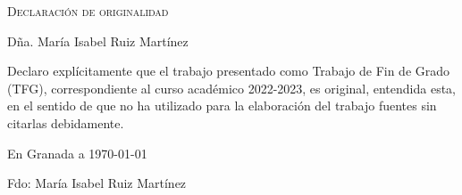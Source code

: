 \newpage
\null
\thispagestyle{empty}
\newpage
\null
\thispagestyle{empty}

\hfill\vfill

\textsc{Declaración de originalidad}\\\bigskip

Dña. María Isabel Ruiz Martínez \\\medskip

Declaro explícitamente que el trabajo presentado como Trabajo de Fin de Grado (TFG), correspondiente al curso académico 2022-2023, es original, entendida esta, en el sentido de que no ha utilizado para la elaboración del trabajo fuentes sin citarlas debidamente.
\medskip

En Granada a \today
\begin{flushleft}
Fdo: María Isabel Ruiz Martínez

\end{flushleft}

\vfill

\endinput